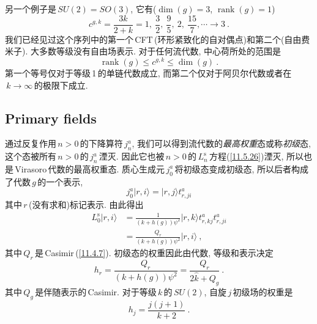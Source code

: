 另一个例子是$\,SU(2)=SO(3)$, 它有($\operatorname{dim}(g)=3$, $\operatorname{rank}(g)=1$)
\begin{equation}
    c^{g,k}=\frac{3k}{2+k} = 1,\:\frac{3}{2},\:\frac{9}{5},\:2,\:\frac{15}{7},\cdots\to3 \:. \label{11.5.36}
\end{equation}
我们已经见过这个序列中的第一个\,CFT\,(环形紧致化的自对偶点)和第二个(自由费米子). 大多数等级没有自由场表示. 对于任何流代数, 中心荷所处的范围是
\begin{equation}
    \operatorname{rank}(g)\leq c^{g,k} \leq \operatorname{dim}(g) \:. \label{11.5.37}
\end{equation}
第一个等号仅对于等级\,1\,的单链代数成立, 而第二个仅对于阿贝尔代数或者在$\,k\to\infty\,$的极限下成立.

\subsection*{Primary fields}

通过反复作用$\,n>0\,$的下降算符$\,j_{n}^{a}$, 我们可以得到流代数的{\emph{最高权重}}态或称{\emph{初级}}态, 这个态被所有$\,n>0\,$的$\,j_{n}^{a}\,$湮灭. 因此它也被$\,n>0\,$的$\,L_{n}^{\mathrm{s}}\,$方程(\ref{11.5.26})湮灭, 所以也是\,Virasoro\,代数的最高权重态. 质心生成元$\,j_{0}^{a}\,$将初级态变成初级态, 所以后者构成了代数$\,g\,$的一个表示,
\begin{equation}
    j_{0}^{a}\lvert r,i\rangle = \lvert r,j\rangle t_{r,ji}^{a} \label{11.5.38}
\end{equation}
其中$\,r\,$(没有求和)标记表示. 由此得出
\begin{align}
    L_{0}^{\mathrm{s}}\lvert r,i\rangle &= \frac{1}{(k+h(g))\psi^{2}} \lvert r,k \rangle t_{r,kj}^{a}t_{r,ji}^{a} \nonumber\\ 
    &= \frac{Q_{r}}{(k+h(g))\psi^{2}} \lvert r,i \rangle \:, \label{11.5.39}
\end{align}
其中$\,Q_{r}\,$是\,Casimir\,(\ref{11.4.7}). 初级态的权重因此由代数, 等级和表示决定
\begin{equation}
    h_{r} = \frac{Q_{r}}{(k+h(g))\psi^{2}} = \frac{Q_{r}}{2\hat{k}+Q_{g}} \:. \label{11.5.40}
\end{equation}
其中$\,Q_{g}\,$是伴随表示的\,Casimir. 对于等级$\,k\,$的$\,SU(2)$, 自旋$\,j\,$初级场的权重是
\begin{equation}
    h_{j} = \frac{j(j+1)}{k+2} \:. \label{11.5.41}
\end{equation}


